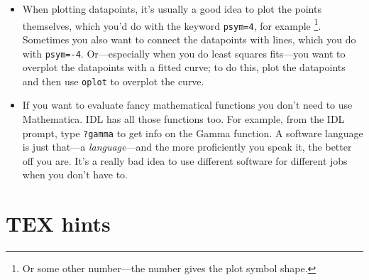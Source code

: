 \documentclass[11pt,preprint]{aastex}
\begin{document}
\begin{itemize}
	\item When plotting datapoints, it's usually a good idea to plot
the points themselves, which you'd do with the keyword \verb$psym=4$,
for example \footnote{Or some other number---the number gives the plot
symbol shape.}.  Sometimes you also want to connect the datapoints with
lines, which you do with \verb$psym=-4$.  Or---especially when you do
least squares fits---you want to overplot the datapoints with a fitted
curve; to do this, plot the datapoints and then use \verb$oplot$ to
overplot the curve. 

\item If you want to evaluate fancy mathematical functions you don't
need to use Mathematica.  IDL has all those functions too.  For example,
from the IDL prompt, type \verb$?gamma$ to get info on the Gamma
function.  A software language is just that---a {\it language}---and the
more proficiently you speak it, the better off you are.  It's a really
bad idea to use different software for different jobs when you don't
have to. 

\end{itemize}

\section{TEX hints}
\end{document}
